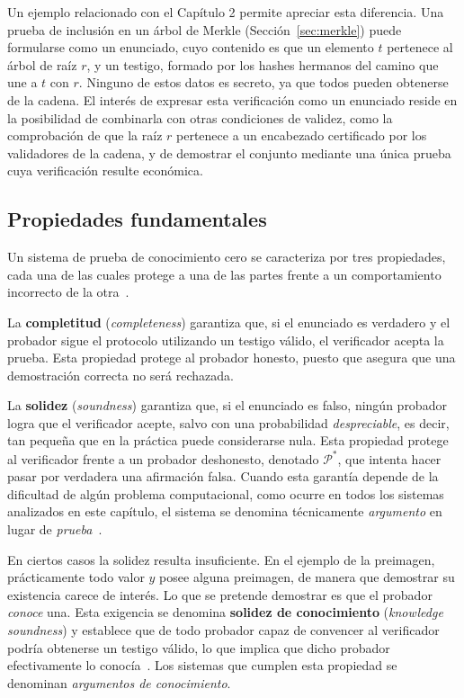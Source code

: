 Un ejemplo relacionado con el Capítulo 2 permite apreciar esta diferencia. Una prueba de
inclusión en un árbol de Merkle (Sección~\ref{sec:merkle}) puede formularse como un enunciado,
cuyo contenido es que un elemento $t$ pertenece al árbol de raíz $r$, y un testigo, formado por
los hashes hermanos del camino que une a $t$ con $r$. Ninguno de estos datos es secreto, ya que
todos pueden obtenerse de la cadena. El interés de expresar esta verificación como un enunciado
reside en la posibilidad de combinarla con otras condiciones de validez, como la comprobación de
que la raíz $r$ pertenece a un encabezado certificado por los validadores de la cadena, y de
demostrar el conjunto mediante una única prueba cuya verificación resulte económica.

\subsection{Propiedades fundamentales}
\label{sec:propiedades_zk}

Un sistema de prueba de conocimiento cero se caracteriza por tres propiedades, cada una de las
cuales protege a una de las partes frente a un comportamiento incorrecto de la
otra~\cite{goldwasser1989knowledge, thaler2022proofs}.

La \textbf{completitud} (\textit{completeness}) garantiza que, si el enunciado es verdadero y el
probador sigue el protocolo utilizando un testigo válido, el verificador acepta la prueba. Esta
propiedad protege al probador honesto, puesto que asegura que una demostración correcta no será
rechazada.

La \textbf{solidez} (\textit{soundness}) garantiza que, si el enunciado es falso, ningún
probador logra que el verificador acepte, salvo con una probabilidad \textit{despreciable}, es
decir, tan pequeña que en la práctica puede considerarse nula. Esta propiedad protege al
verificador frente a un probador deshonesto, denotado $\mathcal{P}^{*}$, que intenta hacer pasar
por verdadera una afirmación falsa. Cuando esta garantía depende de la dificultad de algún problema
computacional, como ocurre en todos los sistemas analizados en este capítulo, el sistema se
denomina técnicamente \textit{argumento} en lugar de \textit{prueba}~\cite{brassard1988minimum}.

En ciertos casos la solidez resulta insuficiente. En el ejemplo de la preimagen, prácticamente
todo valor $y$ posee alguna preimagen, de manera que demostrar su existencia carece de interés.
Lo que se pretende demostrar es que el probador \textit{conoce} una. Esta exigencia se denomina
\textbf{solidez de conocimiento} (\textit{knowledge soundness}) y establece que de todo probador
capaz de convencer al verificador podría obtenerse un testigo válido, lo que implica que dicho
probador efectivamente lo conocía~\cite{bellare1993defining}. Los sistemas que cumplen esta
propiedad se denominan \textit{argumentos de conocimiento}.

